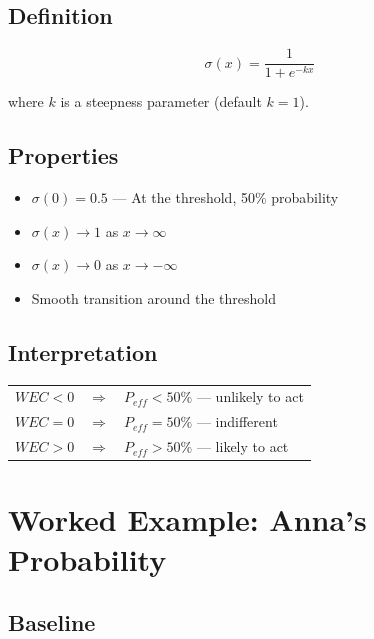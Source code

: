 \subsection{Definition}

\begin{equation}
\sigma(x) = \frac{1}{1 + e^{-kx}}
\end{equation}

where $k$ is a steepness parameter (default $k = 1$).

\subsection{Properties}

\begin{itemize}
    \item $\sigma(0) = 0.5$ — At the threshold, 50\% probability
    \item $\sigma(x) \rightarrow 1$ as $x \rightarrow \infty$
    \item $\sigma(x) \rightarrow 0$ as $x \rightarrow -\infty$
    \item Smooth transition around the threshold
\end{itemize}

\subsection{Interpretation}

\begin{center}
\begin{tabular}{rcl}
$WEC < 0$ & $\Rightarrow$ & $P_{eff} < 50\%$ — unlikely to act \\
$WEC = 0$ & $\Rightarrow$ & $P_{eff} = 50\%$ — indifferent \\
$WEC > 0$ & $\Rightarrow$ & $P_{eff} > 50\%$ — likely to act
\end{tabular}
\end{center}

\section{Worked Example: Anna's Probability}

\subsection{Baseline}

